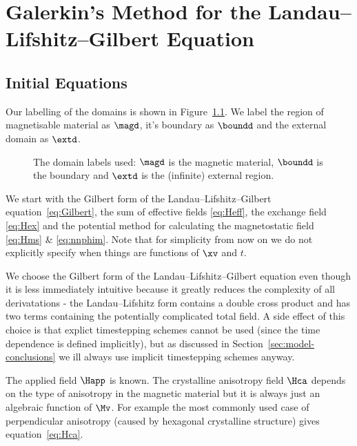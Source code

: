 
\chapter{Galerkin's Method for the Landau--Lifshitz--Gilbert Equation}
\label{sec:galerk-meth-llg}

\section{Initial Equations}

Our labelling of the domains is shown in Figure~\ref{fig:domain_labels}. We label the region of magnetisable material as $\magd$, it's boundary as $\boundd$ and the external domain as $\extd$.

\begin{figure}[!ht]
  \center
  \caption{The domain labels used: $\magd$ is the magnetic material, $\boundd$ is the boundary and $\extd$ is the (infinite) external region.} \label{fig:domain_labels}
\end{figure}

We start with the Gilbert form of the Landau--Lifshitz--Gilbert equation~\eqref{eq:Gilbert}, the sum of effective fields \eqref{eq:Heff}, the exchange field \eqref{eq:Hex} and the potential method for calculating the magnetostatic field \eqref{eq:Hms} \& \eqref{eq:nnphim}. Note that for simplicity from now on we do not explicitly specify when things are functions of $\xv$ and $t$.

We choose the Gilbert form of the Landau--Lifshitz--Gilbert equation even though it is less immediately intuitive because it greatly reduces the complexity of all derivatations - the Landau--Lifshitz form contains a double cross product and has two terms containing the potentially complicated total field. A side effect of this choice is that explict timestepping schemes cannot be used (since the time dependence is defined implicitly), but as discussed in Section~\ref{sec:model-conclusions} we ill always use implicit timestepping schemes anyway.

The applied field $\Happ$ is known. The crystalline anisotropy field $\Hca$ depends on the type of anisotropy in the magnetic material but it is always just an algebraic function of $\Mv$. For example the most commonly used case of perpendicular anisotropy (caused by hexagonal crystalline structure) gives equation~\eqref{eq:Hca}.

